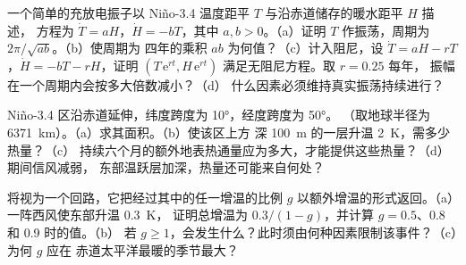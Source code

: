 \begin{exercise}[$\star\star\star$]\label{exo:b2:climate-variability:10}
一个简单的充放电振子以 Niño-3.4 温度距平 $T$ 与沿赤道储存的暖水距平 $H$ 描述，
方程为 $\dot T = aH$，$\dot H = -bT$，其中 $a, b > 0$。（a）证明
$T$ 作振荡，周期为 $2\pi/\sqrt{ab}$。（b）使周期为
四年的乘积 $ab$ 为何值？（c）计入阻尼，设 $\dot T = aH - rT$，$\dot H = -bT - rH$，证明
$(T\,\mathrm{e}^{rt}, H\,\mathrm{e}^{rt})$ 满足无阻尼方程。取 $r = 0.25$ 每年，
振幅在一个周期内会按多大倍数减小？（d）
什么因素必须维持真实振荡持续进行？
\end{exercise}

\begin{exercise}[$\star\star\star$]\label{exo:b2:climate-variability:11}
Niño-3.4 区沿赤道延伸，纬度跨度为 \ang{10}，经度跨度为 \ang{50}。
（取地球半径为 \qty{6371}{km}）。（a）求其面积。（b）使该区上方
深 \qty{100}{m} 的一层升温 \qty{2}{K}，需多少热量？（c）
持续六个月的额外地表热通量应为多大，才能提供这些热量？（d）期间信风减弱，
东部温跃层加深，热量还可能来自何处？
\end{exercise}

\begin{exercise}[$\star\star\star$]\label{exo:b2:climate-variability:12}
将视为一个回路，它把经过其中的任一增温的比例 $g$
以额外增温的形式返回。（a）一阵西风使东部升温 \qty{0.3}{K}，
证明总增温为 $0.3/(1 - g)$，并计算 $g = 0.5$、0.8 和 0.9 时的值。（b）
若 $g \geq 1$，会发生什么？此时须由何种因素限制该事件？（c）为何 $g$ 应在
赤道太平洋最暖的季节最大？
\end{exercise}

